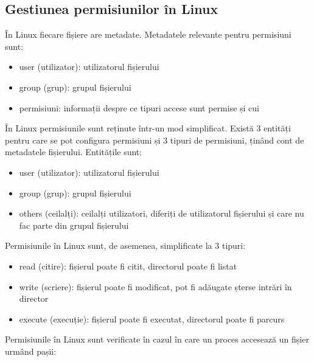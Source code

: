 \subsection{Gestiunea permisiunilor în Linux}
\label{sec:users-fs-perms-linux}

În Linux fiecare fișiere are metadate. Metadatele relevante pentru permisiuni sunt:

\begin{itemize}
	\item user (utilizator): utilizatorul fișierului
	\item group (grup): grupul fișierului
	\item permisiuni: informații despre ce tipuri accese sunt permise și cui
\end{itemize}

În Linux permisiunile sunt reținute într-un mod simplificat. Există 3 entități
pentru care se pot configura permisiuni și 3 tipuri de permisiuni, ținând cont
de metadatele fișierului. Entitățile sunt:

\begin{itemize}
	\item user (utilizator): utilizatorul fișierului
	\item group (grup): grupul fișierului
	\item others (ceilalți): ceilalți utilizatori, diferiți de utilizatorul
		fișierului și care nu fac parte din grupul fișierului
\end{itemize}

Permisiunile în Linux sunt, de asemenea, simplificate la 3 tipuri:

\begin{itemize}
	\item read (citire): fișierul poate fi citit, directorul poate fi listat
	\item write (scriere): fișierul poate fi modificat, pot fi adăugate
		șterse intrări în director
	\item execute (execuție): fișierul poate fi executat, directorul poate
		fi parcurs
\end{itemize}

Permisiunile în Linux sunt verificate în cazul în care un proces accesează un
fișier urmând pașii:

